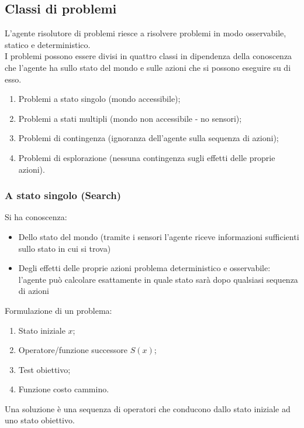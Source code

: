 \documentclass[../main.tex]{subfiles}
\begin{document}
	\subsection{Classi di problemi} 
	L’agente risolutore di problemi riesce a risolvere problemi in modo osservabile, statico e deterministico. \\
	I problemi possono essere divisi in quattro classi in dipendenza della conoscenza che l’agente ha sullo stato del mondo e sulle azioni che si possono eseguire su di esso.
	\begin{enumerate}
		\item Problemi a stato singolo (mondo accessibile);
		\item Problemi a stati multipli (mondo non accessibile - no sensori);
		\item Problemi di contingenza (ignoranza dell’agente sulla sequenza di azioni);
		\item Problemi di esplorazione (nessuna contingenza sugli effetti delle proprie azioni).
	\end{enumerate}
	\subsubsection{A stato singolo (Search)}
	Si ha conoscenza:
	\begin{itemize}
		\item Dello stato del mondo (tramite i sensori l’agente riceve informazioni sufficienti sullo stato in cui si trova)
		\item Degli effetti delle proprie azioni problema deterministico e osservabile: l’agente può calcolare esattamente in quale stato sarà dopo qualsiasi sequenza di azioni
	\end{itemize}
	Formulazione di un problema:
	\begin{enumerate}
		\item Stato iniziale $x$;
		\item Operatore/funzione successore $S(x)$;
		\item Test obiettivo;
		\item Funzione costo cammino.
	\end{enumerate}
	Una soluzione è una sequenza di operatori che conducono dallo stato iniziale ad uno stato obiettivo.
\end{document}
